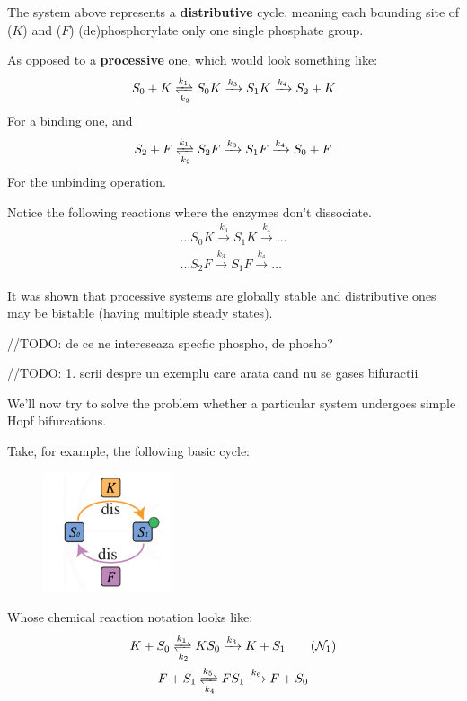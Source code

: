 The system above represents a \textbf{distributive} cycle, meaning each bounding site of ($K$) and ($F$) (de)phosphorylate only one single phosphate group.

As opposed to a \textbf{processive} one, which would look something like:
\begin{equation*}
	S_0 + K \xrightleftharpoons[k_2]{k_1} S_0 K \xrightarrow{k_3} S_1 K \xrightarrow{k_4} S_2 + K
\end{equation*}
For a binding one, and
\begin{equation*}
	S_2 + F \xrightleftharpoons[k_2]{k_1} S_2 F \xrightarrow{k_3} S_1 F \xrightarrow{k_4} S_0 + F
\end{equation*}
For the unbinding operation.

Notice the following reactions where the enzymes don't dissociate.
\begin{gather*}
	\ldots S_0 K \xrightarrow{k_3} S_1 K \xrightarrow{k_4} \ldots \\
	\ldots S_2 F \xrightarrow{k_3} S_1 F \xrightarrow{k_4} \ldots	
\end{gather*}

It was shown that processive systems are globally stable and distributive ones may be bistable (having multiple steady states).

\hfill\break
//TODO: de ce ne intereseaza specfic phospho, de phosho?
\hfill\break

\hfill\break
//TODO: 1. scrii despre un exemplu care arata cand nu se gases bifuractii
\hfill\break

We'll now try to solve the problem whether a particular system undergoes simple Hopf bifurcations.

Take, for example, the following basic cycle:
\begin{figure}[h]
	\includegraphics[width=38mm]{math_pics/ex1-no-bifurcations.png}	
	\centering
\end{figure}

Whose chemical reaction notation looks like:
\begin{gather}\label{network1}
	K + S_0 \xrightleftharpoons[k_2]{k_1} K S_0 \xrightarrow{k_3} K + S_1 \tag{$\mathcal{N}_1$} \\
	F + S_1 \xrightleftharpoons[k_4]{k_5} F S_1 \xrightarrow{k_6} F + S_0 \notag
\end{gather}

